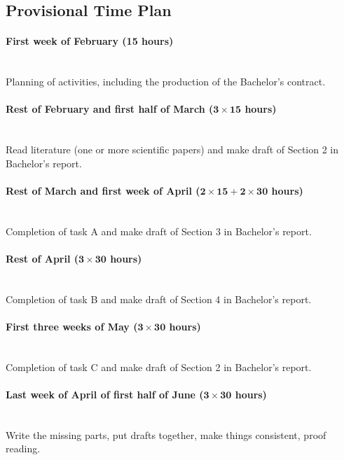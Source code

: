 \documentclass{article}
\newcommand{\timeest}[1]{$\mathbf{#1}$}%
\begin{document}
\subsection*{Provisional Time Plan}


\paragraph{First week of February (15 hours)}~\\\noindent
Planning of activities, including the production of the Bachelor's contract.

\paragraph{Rest of February and first half of March (\timeest{3\times 15} hours)}~\\\noindent
Read literature (one or more scientific papers) and make draft of Section 2 in Bachelor's report.

\paragraph{Rest of March and first week of April (\timeest{2\times 15+2\times 30} hours)}~\\\noindent
Completion of task A and make draft of Section 3 in Bachelor's report.

\paragraph{Rest of April (\timeest{3\times 30} hours)}~\\\noindent
Completion of task B and make draft of Section 4 in Bachelor's report.

\paragraph{First three weeks of May (\timeest{3\times 30} hours)}~\\\noindent
Completion of task C and make draft of Section 2 in Bachelor's report.

\paragraph{Last week of April of first half of June (\timeest{3\times 30} hours)}~\\\noindent
Write the missing parts, put drafts together, make things consistent, proof reading.
\end{document}
